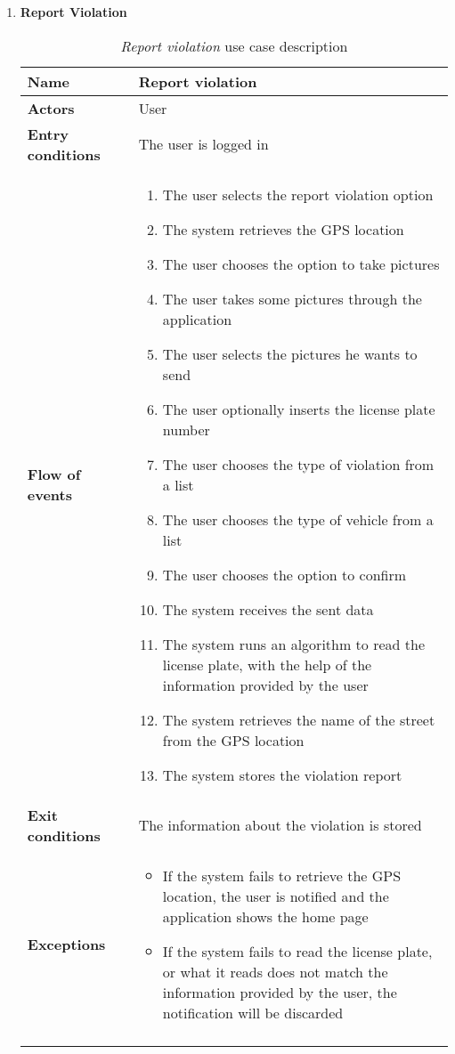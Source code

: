 \begin{enumerate}
				\FloatBarrier
				\newpage
			\item \textbf{Report Violation}
				\begin{longtable}{p{0.26\linewidth}p{0.75\linewidth}}
					\toprule
					\textbf{Name} & \textbf{Report violation} \\
					\midrule
					\textbf{Actors} & User \\
					\midrule
					\textbf{Entry conditions} & The user is logged in \\
					\midrule
					\textbf{Flow of events} & 
					\begin{enumerate}
						\item The user selects the report violation option
						\item The system retrieves the GPS location
						\item The user chooses the option to take pictures
						\item The user takes some pictures through the application
						\item The user selects the pictures he wants to send
						\item The user optionally inserts the license plate number
						\item The user chooses the type of violation from a list
						\item The user chooses the type of vehicle from a list
						\item The user chooses the option to confirm
						\item The system receives the sent data
						\item The system runs an algorithm to read the license plate, with the help of the information provided by the user
						\item The system retrieves the name of the street from the GPS location
						\item The system stores the violation report
					\end{enumerate} \\
					\midrule
					\textbf{Exit conditions} & The information about the violation is stored\\
					\midrule
					\textbf{Exceptions} & 
					\begin{itemize}
						\item If the system fails to retrieve the GPS location, the user is notified and the application shows the home page
						\item If the system fails to read the license plate, or what it reads does not match the information provided by the user, the notification will be discarded
					\end{itemize} \\
					\bottomrule
					\caption{\emph{Report violation} use case description}
				\end{longtable}
			

\end{enumerate}
